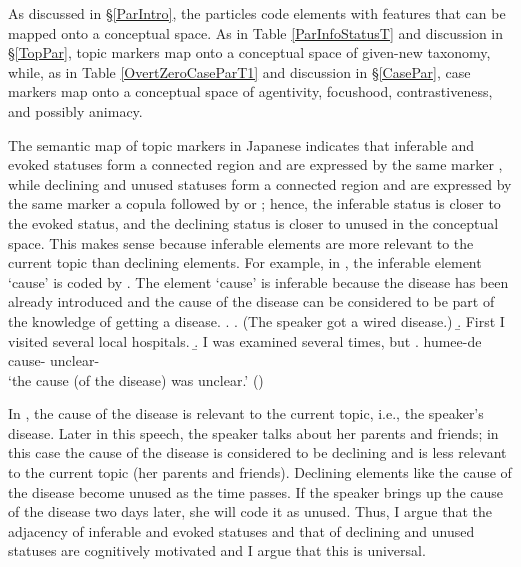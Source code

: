 As discussed in \S \ref{ParIntro},
the particles code elements with features that can be mapped onto a conceptual space.
As in Table \ref{ParInfoStatusT} and discussion in \S \ref{TopPar},
topic markers map onto a conceptual space of given-new taxonomy,
while, as in Table \ref{OvertZeroCaseParT1} and discussion in \S \ref{CasePar},
case markers map onto a conceptual space of agentivity, focushood, contrastiveness, and possibly animacy.

The semantic map of topic markers in Japanese indicates that
inferable and evoked statuses form a connected region and are expressed by the same marker ,
while declining and unused statuses form a connected region and are expressed by the same marker a copula followed by  or ;
hence, the inferable status is closer to the evoked status, and the declining status is closer to unused in the conceptual space.
This makes sense because inferable elements are more relevant to
the current topic than declining elements.
For example, in \Next,
the inferable element  `cause' is coded by .
The element `cause' is inferable because the disease has been already introduced and the cause of the disease can be considered to be part of the knowledge of getting a disease.
%
\ex.
 \a. (The speaker got a wired disease.)
 \b. First I visited several local hospitals.
 \b. I was examined several times, but
 \bg.  humee-de \\
   cause- unclear- \\
   `the cause (of the disease) was unclear.'
   \hfill{()}
%

In \Last,
the cause of the disease is relevant to the current topic, i.e., the speaker's disease.
Later in this speech,
the speaker talks about her parents and friends;
in this case the cause of the disease is considered to be declining and is less relevant to the current topic (her parents and friends).
Declining elements like the cause of the disease become unused as the time passes.
If the speaker brings up the cause of the disease two days later,
she will code it as unused.
Thus, I argue that the adjacency of inferable and evoked statuses and that of declining and unused statuses are cognitively motivated and I argue that this is universal.

